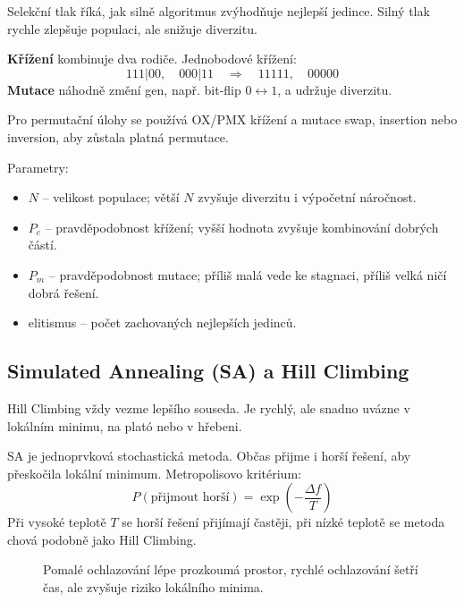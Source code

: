 Selekční tlak říká, jak silně algoritmus zvýhodňuje nejlepší jedince. Silný
tlak rychle zlepšuje populaci, ale snižuje diverzitu.

\textbf{Křížení} kombinuje dva rodiče. Jednobodové křížení:
\begin{equation}
    111|00,\quad 000|11 \quad \Rightarrow \quad 11111,\quad 00000
\end{equation}
\textbf{Mutace} náhodně změní gen, např. bit-flip \(0 \leftrightarrow 1\), a udržuje diverzitu.

Pro permutační úlohy se používá OX/PMX křížení a mutace swap, insertion nebo
inversion, aby zůstala platná permutace.

Parametry:
\begin{itemize}
    \item \(N\) -- velikost populace; větší \(N\) zvyšuje diverzitu i výpočetní náročnost.
    \item \(P_c\) -- pravděpodobnost křížení; vyšší hodnota zvyšuje kombinování dobrých částí.
    \item \(P_m\) -- pravděpodobnost mutace; příliš malá vede ke stagnaci, příliš velká ničí dobrá řešení.
    \item elitismus -- počet zachovaných nejlepších jedinců.
\end{itemize}

\subsection*{Simulated Annealing (SA) a Hill Climbing}
Hill Climbing vždy vezme lepšího souseda. Je rychlý, ale snadno uvázne v
lokálním minimu, na plató nebo v hřebeni.

SA je jednoprvková stochastická metoda. Občas přijme i horší řešení, aby
přeskočila lokální minimum. Metropolisovo kritérium:
\begin{equation}
    P(\text{přijmout horší})=\exp\left(-\frac{\Delta f}{T}\right)
\end{equation}
Při vysoké teplotě \(T\) se horší řešení přijímají častěji, při nízké teplotě
se metoda chová podobně jako Hill Climbing.

\begin{figure}[H]
    \centering
    \caption{Pomalé ochlazování lépe prozkoumá prostor, rychlé ochlazování šetří čas, ale zvyšuje riziko lokálního minima.}
\end{figure}

